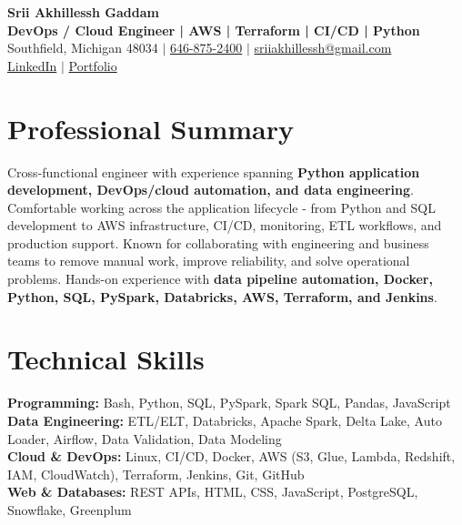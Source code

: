 \documentclass[letterpaper,10pt]{article}
\begin{document}
\fontsize{9.35pt}{10.45pt}\selectfont

\begin{center}
    {\LARGE \textbf{Srii Akhillessh Gaddam}} \\[-1pt]
    \textbf{DevOps / Cloud Engineer | AWS | Terraform | CI/CD | Python} \\[2pt]
    Southfield, Michigan 48034 $|$
    \href{tel:6468752400}{646-875-2400} $|$
    \href{mailto:sriiakhillessh@gmail.com}{sriiakhillessh@gmail.com} \\[1pt]
    \href{https://www.linkedin.com/in/srii-akhiilessh-gaddam-b48668191/}{LinkedIn} $|$
    \href{https://sriiakhillesshg.github.io/portfolio/}{Portfolio}
\end{center}
\vspace{-8pt}

\section{Professional Summary}
\small{Cross-functional engineer with experience spanning \textbf{Python application development, DevOps/cloud automation, and data engineering}. Comfortable working across the application lifecycle - from Python and SQL development to AWS infrastructure, CI/CD, monitoring, ETL workflows, and production support. Known for collaborating with engineering and business teams to remove manual work, improve reliability, and solve operational problems. Hands-on experience with \textbf{data pipeline automation, Docker, Python, SQL, PySpark, Databricks, AWS, Terraform, and Jenkins}.}

\section{Technical Skills}
\small{
\textbf{Programming:} Bash, Python, SQL, PySpark, Spark SQL, Pandas, JavaScript \\
\textbf{Data Engineering:} ETL/ELT, Databricks, Apache Spark, Delta Lake, Auto Loader, Airflow, Data Validation, Data Modeling \\
\textbf{Cloud \& DevOps:} Linux, CI/CD, Docker, AWS (S3, Glue, Lambda, Redshift, IAM, CloudWatch), Terraform, Jenkins, Git, GitHub \\
\textbf{Web \& Databases:} REST APIs, HTML, CSS, JavaScript, PostgreSQL, Snowflake, Greenplum
}
\end{document}

